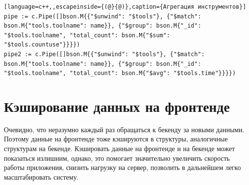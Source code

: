 \begin{lstlisting}[language=c++,,escapeinside={(@}{@)},caption={Агрегация инструментов}] 
pipe := c.Pipe([]bson.M{{"$unwind": "$tools"}, {"$match": bson.M{"tools.toolname": name}}, {"$group": bson.M{"_id": "$tools.toolname", "total_count": bson.M{"$sum": "$tools.countuse"}}}})
pipe2 := c.Pipe([]bson.M{{"$unwind": "$tools"}, {"$match": bson.M{"tools.toolname": name}}, {"$group": bson.M{"_id": "$tools.toolname", "total_count": bson.M{"$avg": "$tools.time"}}}})
\end{lstlisting}
\section{Кэширование данных на фронтенде}
Очевидно, что неразумно каждый раз обращаться к бекенду за новыми данными. Поэтому данные на фронтенде тоже кэшируются в структуры, аналогичные структурам на бекенде.
Кэшировать данные на фронтенде и на бекенде может показаться излишним, однако, это помогает значительно увеличить скорость работы приложения, снизить нагрузку на сервер, позволить в дальнейшем легко масштабировать систему.

